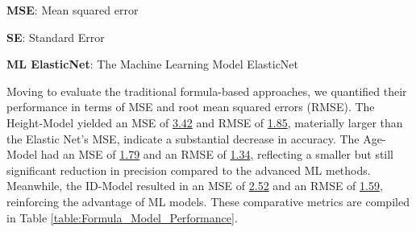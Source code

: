 \documentclass[11pt]{article}
\begin{document}
\begin{table}[h]
\caption{Machine learning models performance comparison.}
\label{table:ML_Model_Performance}
\begin{threeparttable}
\renewcommand{\TPTminimum}{\linewidth}
\begin{tablenotes}
\footnotesize
\item \textbf{MSE}: Mean squared error
\item \textbf{SE}: Standard Error
\item \textbf{ML ElasticNet}: The Machine Learning Model ElasticNet
\end{tablenotes}
\end{threeparttable}
\end{table}

Moving to evaluate the traditional formula-based approaches, we quantified their performance in terms of MSE and root mean squared errors (RMSE). The Height-Model yielded an MSE of \hyperlink{B0a}{3.42} and RMSE of \hyperlink{B0b}{1.85}, materially larger than the Elastic Net's MSE, indicate a substantial decrease in accuracy. The Age-Model had an MSE of \hyperlink{B1a}{1.79} and an RMSE of \hyperlink{B1b}{1.34}, reflecting a smaller but still significant reduction in precision compared to the advanced ML methods. Meanwhile, the ID-Model resulted in an MSE of \hyperlink{B2a}{2.52} and an RMSE of \hyperlink{B2b}{1.59}, reinforcing the advantage of ML models. These comparative metrics are compiled in Table \ref{table:Formula_Model_Performance}.
\end{document}
